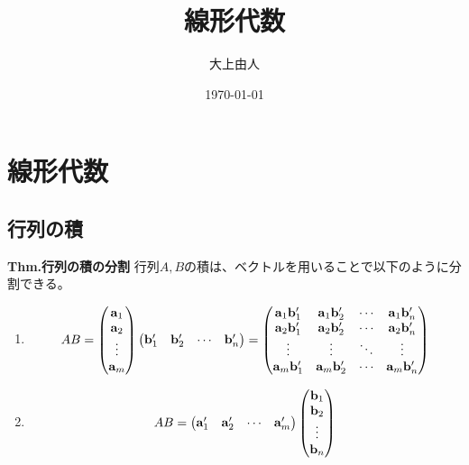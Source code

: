 \documentclass[a4paper,11pt]{jsarticle}
\numberwithin{equation}{section}
\begin{document}
\title{線形代数}
\author{大上由人}
\date{\today}
\maketitle

\tableofcontents
\newpage

\section{線形代数}
\subsection{行列の積}
\begin{itembox}[l]{\textbf{Thm.行列の積の分割}}
  行列$A,B$の積は、ベクトルを用いることで以下のように分割できる。
  \begin{enumerate}
    \item 
    \begin{align}
      AB = \begin{pmatrix}
        \vb{a}_1\\
        \vb{a}_2\\
        \vdots\\
        \vb{a}_m
      \end{pmatrix}
      \begin{pmatrix}
        \vb{b}'_1 & \vb{b}'_2 & \cdots & \vb{b}'_n
      \end{pmatrix}
      =
      \begin{pmatrix}
        \vb{a}_1 \vb{b}'_1 & \vb{a}_1 \vb{b}'_2 & \cdots & \vb{a}_1 \vb{b}'_n\\
        \vb{a}_2 \vb{b}'_1 & \vb{a}_2 \vb{b}'_2 & \cdots & \vb{a}_2 \vb{b}'_n\\
        \vdots & \vdots & \ddots & \vdots\\
        \vb{a}_m \vb{b}'_1 & \vb{a}_m \vb{b}'_2 & \cdots & \vb{a}_m \vb{b}'_n
      \end{pmatrix}
    \end{align}
  \item 
  \begin{align}
    AB = \begin{pmatrix}
      \vb{a}'_1 & \vb{a}'_2 & \cdots & \vb{a}'_m
    \end{pmatrix}
    \begin{pmatrix}
      \vb{b}_1\\
      \vb{b}_2\\
      \vdots\\
      \vb{b}_n

\end{pmatrix}
\end{align}
\end{enumerate}
\end{itembox}
\end{document}
